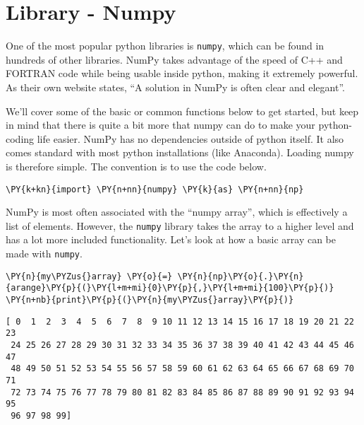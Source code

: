\section{Library - Numpy}
One of the most popular python libraries is \texttt{numpy}, which can be
found in hundreds of other libraries. NumPy takes advantage of the speed
of C++ and FORTRAN code while being usable inside python, making it
extremely powerful. As their own website states, ``A solution in NumPy
is often clear and elegant''.

We'll cover some of the basic or common functions below to get started,
but keep in mind that there is quite a bit more that numpy can do to
make your python-coding life easier. NumPy has no dependencies outside
of python itself. It also comes standard with most python installations
(like Anaconda). Loading numpy is therefore simple. The convention is to
use the code below.

    \begin{tcolorbox}[breakable, size=fbox, boxrule=1pt, pad at break*=1mm,colback=cellbackground, colframe=cellborder]
\begin{Verbatim}[commandchars=\\\{\}]
\PY{k+kn}{import} \PY{n+nn}{numpy} \PY{k}{as} \PY{n+nn}{np}
\end{Verbatim}
\end{tcolorbox}

    NumPy is most often associated with the ``numpy array'', which is
effectively a list of elements. However, the \texttt{numpy} library
takes the array to a higher level and has a lot more included
functionality. Let's look at how a basic array can be made with
\texttt{numpy}.

    \begin{tcolorbox}[breakable, size=fbox, boxrule=1pt, pad at break*=1mm,colback=cellbackground, colframe=cellborder]
\begin{Verbatim}[commandchars=\\\{\}]
\PY{n}{my\PYZus{}array} \PY{o}{=} \PY{n}{np}\PY{o}{.}\PY{n}{arange}\PY{p}{(}\PY{l+m+mi}{0}\PY{p}{,}\PY{l+m+mi}{100}\PY{p}{)}
\PY{n+nb}{print}\PY{p}{(}\PY{n}{my\PYZus{}array}\PY{p}{)}
\end{Verbatim}
\end{tcolorbox}

    \begin{Verbatim}[commandchars=\\\{\}]
[ 0  1  2  3  4  5  6  7  8  9 10 11 12 13 14 15 16 17 18 19 20 21 22 23
 24 25 26 27 28 29 30 31 32 33 34 35 36 37 38 39 40 41 42 43 44 45 46 47
 48 49 50 51 52 53 54 55 56 57 58 59 60 61 62 63 64 65 66 67 68 69 70 71
 72 73 74 75 76 77 78 79 80 81 82 83 84 85 86 87 88 89 90 91 92 93 94 95
 96 97 98 99]
    \end{Verbatim}

